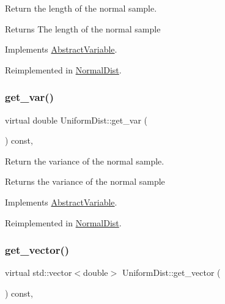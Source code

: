 Return the length of the normal sample. 

\begin{DoxyReturn}{Returns}
The length of the normal sample 
\end{DoxyReturn}


Implements \hyperlink{classAbstractVariable_a96d9b63c3d9aff4673a9c66738302766}{Abstract\+Variable}.



Reimplemented in \hyperlink{classNormalDist_a6dcfba2a8149dbd527392c32b3d7a7a1}{Normal\+Dist}.

\mbox{\label{classUniformDist_aade143a6ff9ed9a8bee2e6b9fb2fed4c}} 
\subsubsection{\texorpdfstring{get\+\_\+var()}{get\_var()}}
{\footnotesize\ttfamily virtual double Uniform\+Dist\+::get\+\_\+var (\begin{DoxyParamCaption}{ }\end{DoxyParamCaption}) const\hspace{0.3cm}{\ttfamily [inline]}, {\ttfamily [virtual]}}



Return the variance of the normal sample. 

\begin{DoxyReturn}{Returns}
the variance of the normal sample 
\end{DoxyReturn}


Implements \hyperlink{classAbstractVariable_a71d378332b0e5b3c1760bb98db5d906b}{Abstract\+Variable}.



Reimplemented in \hyperlink{classNormalDist_a46bc646f126ac3c2d46bcd9ccbf01135}{Normal\+Dist}.

\mbox{\label{classUniformDist_a60df487bfb003628e9997ebcb5aedcde}} 
\subsubsection{\texorpdfstring{get\+\_\+vector()}{get\_vector()}}
{\footnotesize\ttfamily virtual std\+::vector$<$double$>$ Uniform\+Dist\+::get\+\_\+vector (\begin{DoxyParamCaption}{ }\end{DoxyParamCaption}) const\hspace{0.3cm}{\ttfamily [inline]}, {\ttfamily [virtual]}}



